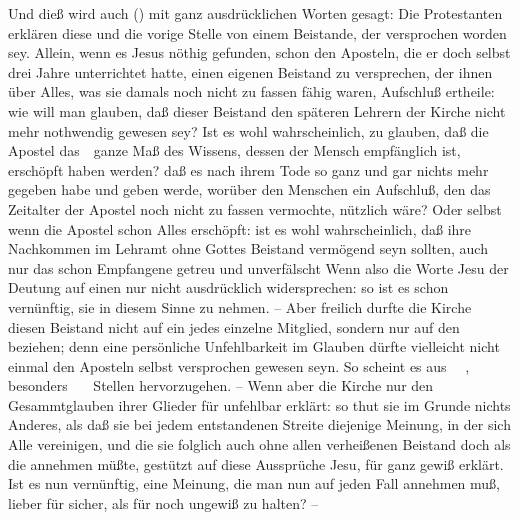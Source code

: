 \begin{aufza}
\item Und dieß wird auch () mit ganz ausdrücklichen Worten gesagt:  Die Protestanten erklären diese und die vorige Stelle von einem Beistande, der  versprochen worden sey. Allein, wenn es Jesus nöthig gefunden, schon den Aposteln, die er doch selbst drei Jahre unterrichtet hatte, einen eigenen Beistand zu versprechen, der ihnen über Alles, was sie damals noch nicht zu fassen fähig waren, Aufschluß ertheile: wie will man glauben, daß dieser Beistand den späteren Lehrern der Kirche nicht mehr nothwendig gewesen sey? Ist es wohl wahrscheinlich, zu glauben, daß die Apostel das~\ ganze Maß des Wissens, dessen der Mensch empfänglich ist, erschöpft haben werden? daß es nach ihrem Tode so ganz und gar nichts mehr gegeben habe und geben werde, worüber den Menschen ein Aufschluß, den das Zeitalter der Apostel noch nicht zu fassen vermochte, nützlich wäre? Oder selbst wenn die Apostel schon Alles erschöpft: ist es wohl wahrscheinlich, daß ihre Nachkommen im Lehramt ohne Gottes Beistand vermögend seyn sollten, auch nur das schon Empfangene getreu und unverfälscht  Wenn also die Worte Jesu der Deutung auf einen  nur nicht ausdrücklich widersprechen: so ist es schon vernünftig, sie in diesem Sinne zu nehmen. -- Aber freilich durfte die Kirche diesen Beistand nicht auf ein jedes einzelne Mitglied, sondern nur auf den  beziehen; denn eine persönliche Unfehlbarkeit im Glauben dürfte vielleicht nicht einmal den Aposteln selbst versprochen gewesen seyn. So scheint es aus \ \ , besonders \ \ \uma\  Stellen hervorzugehen. -- Wenn aber die Kirche nur den Gesammtglauben ihrer Glieder für unfehlbar erklärt: so thut sie im Grunde nichts Anderes, als daß sie bei jedem entstandenen Streite diejenige Meinung, in der sich Alle vereinigen, und die sie folglich auch ohne allen verheißenen Beistand doch als die  annehmen müßte, gestützt auf diese Aussprüche Jesu, für ganz gewiß erklärt. Ist es nun vernünftig, eine Meinung, die man nun auf jeden Fall annehmen muß, lieber für sicher, als für noch ungewiß zu halten? --


\end{aufza}
